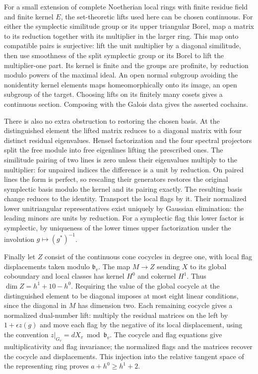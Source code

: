 \documentclass[11pt]{amsart}
\theoremstyle{definition}
\theoremstyle{remark}
\begin{document}
For a small extension of complete Noetherian local rings with
finite residue field and finite kernel $E$, the set-theoretic
lifts used here can be chosen continuous. For either the symplectic
similitude group or its upper triangular Borel, map a matrix to
its reduction together with its multiplier in the larger ring.
This map onto compatible pairs is surjective: lift the unit
multiplier by a diagonal similitude, then use smoothness of the
split symplectic group or its Borel to lift the multiplier-one
part. Its kernel is finite and the groups are profinite, by
reduction modulo powers of the maximal ideal. An open normal
subgroup avoiding the nonidentity kernel elements maps
homeomorphically onto its image, an open subgroup of the target.
Choosing lifts on its finitely many cosets gives a continuous
section. Composing with the Galois data gives the asserted cochains.

There is also no extra obstruction to restoring the chosen basis.
At the distinguished element the lifted matrix reduces to a diagonal
matrix with four distinct residual eigenvalues. Hensel factorization
and the four spectral projectors split the free module into free
eigenlines lifting the prescribed ones. The similitude pairing of
two lines is zero unless their eigenvalues multiply to the
multiplier: for unpaired indices the difference is a unit by
reduction. On paired lines the form is perfect, so rescaling their
generators restores the original symplectic basis modulo the kernel
and its pairing exactly. The resulting basis change reduces to the
identity. Transport the local flags by it. Their normalized lower
unitriangular representatives exist uniquely by Gaussian elimination:
the leading minors are units by reduction. For a symplectic flag
this lower factor is symplectic, by uniqueness of the lower times
upper factorization under the involution $g\mapsto (g^*)^{-1}$.

Finally let $Z$ consist of the continuous cone cocycles in degree
one, with local flag displacements taken modulo $\mathfrak b_v$.
The map $M\to Z$ sending $X$ to its global coboundary and local
classes has kernel $H^0$ and cokernel $H^1$. Thus
$\dim Z=h^1+10-h^0$. Requiring the value of the global cocycle at
the distinguished element to be diagonal imposes at most eight
linear conditions, since the diagonal in $M$ has dimension two.
Each remaining cocycle gives a normalized dual-number lift:
multiply the residual matrices on the left by $1+\epsilon z(g)$
and move each flag by the negative of its local displacement,
using the convention $z|_{G_v}=dX_v\bmod\mathfrak b_v$.
The cocycle and flag equations give multiplicativity and flag
invariance; the normalized flags and the matrices recover the
cocycle and displacements. This injection into the relative tangent
space of the representing ring proves $a+h^0\ge h^1+2$.
\end{document}
